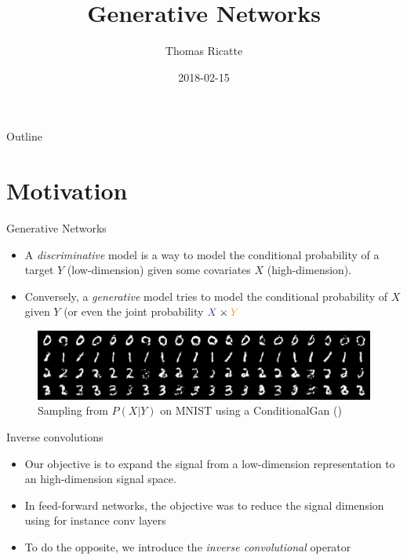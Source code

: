 \documentclass{beamer}
\title{Generative Networks}
\author{Thomas Ricatte}
\date{2018-02-15}
\begin{document}
\begin{frame} 	 
\titlepage
\end{frame}

\begin{frame}[fragile]{Outline}
  \tableofcontents
\end{frame}

\section{Motivation}

\begin{frame}{Generative Networks}

\begin{itemize}
    \item A \emph{discriminative} model is a way to model the conditional probability of a target \textcolor{cOrange}{$Y$ (low-dimension)} given some covariates \textcolor{cBlue}{$X$ (high-dimension)}.
    \item Conversely, a \emph{generative} model tries to model the conditional probability of \textcolor{cBlue}{$X$} given \textcolor{cOrange}{$Y$} (or even the joint probability $\textcolor{cBlue}{X} \times \textcolor{cOrange}{Y}$
\end{itemize}
\begin{figure}
    \centering
    \includegraphics[width=0.7\linewidth]{images/conditional_mnist.png}
    \caption{Sampling from $P(X|Y)$ on MNIST using a ConditionalGan (\cite{cgan})}
\end{figure}
\end{frame}

\begin{frame}{Inverse convolutions}
    \begin{itemize}
    \item Our objective is to expand the signal from a \textcolor{cOrange}{low-dimension} representation to an \textcolor{cBlue}{high-dimension} signal space.
    \item In feed-forward networks, the objective was to reduce the signal dimension using for instance conv layers
    \end{itemize}
    \begin{figure}
        \centering
    \end{figure}
    \begin{itemize}
        \item To do the opposite, we introduce the \emph{inverse convolutional} operator
    \end{itemize}
\end{frame}
\end{document}
